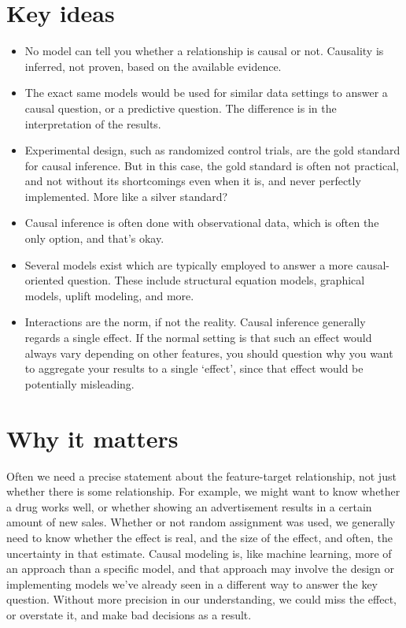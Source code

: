 \documentclass[
  letterpaper,
]{krantz}
\providecommand{\tightlist}{%
  \setlength{\itemsep}{0pt}\setlength{\parskip}{0pt}}\usepackage{longtable,booktabs,array}
\begin{document}
\section{Key ideas}\label{key-ideas-7}

\begin{itemize}
\tightlist
\item
  No model can tell you whether a relationship is causal or not.
  Causality is inferred, not proven, based on the available evidence.
\item
  The exact same models would be used for similar data settings to
  answer a causal question, or a predictive question. The difference is
  in the interpretation of the results.
\item
  Experimental design, such as randomized control trials, are the gold
  standard for causal inference. But in this case, the gold standard is
  often not practical, and not without its shortcomings even when it is,
  and never perfectly implemented. More like a silver standard?
\item
  Causal inference is often done with observational data, which is often
  the only option, and that's okay.
\item
  Several models exist which are typically employed to answer a more
  causal-oriented question. These include structural equation models,
  graphical models, uplift modeling, and more.
\item
  Interactions are the norm, if not the reality. Causal inference
  generally regards a single effect. If the normal setting is that such
  an effect would always vary depending on other features, you should
  question why you want to aggregate your results to a single `effect',
  since that effect would be potentially misleading.
\end{itemize}

\section{Why it matters}\label{why-it-matters}

Often we need a precise statement about the feature-target relationship,
not just whether there is some relationship. For example, we might want
to know whether a drug works well, or whether showing an advertisement
results in a certain amount of new sales. Whether or not random
assignment was used, we generally need to know whether the effect is
real, and the size of the effect, and often, the uncertainty in that
estimate. Causal modeling is, like machine learning, more of an approach
than a specific model, and that approach may involve the design or
implementing models we've already seen in a different way to answer the
key question. Without more precision in our understanding, we could miss
the effect, or overstate it, and make bad decisions as a result.
\end{document}
